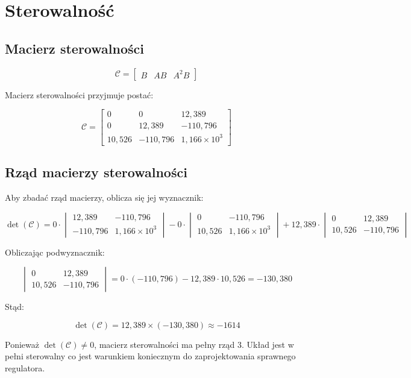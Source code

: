 \section{Sterowalność}

\subsection{Macierz sterowalności}

\begin{equation}
\mathcal{C} = \begin{bmatrix} B & AB & A^2 B \end{bmatrix}
\end{equation}

Macierz sterowalności przyjmuje postać:

\begin{equation}
\mathcal{C} = \begin{bmatrix} 0 & 0 & 12{,}389 \\ 0 & 12{,}389 & -110{,}796 \\ 10{,}526 & -110{,}796 & 1{,}166 \times 10^3 \end{bmatrix}
\end{equation}

\subsection{Rząd macierzy sterowalności}

Aby zbadać rząd macierzy, oblicza się jej wyznacznik:

\begin{equation}
\det(\mathcal{C}) = 0 \cdot \begin{vmatrix} 12{,}389 & -110{,}796 \\ -110{,}796 & 1{,}166 \times 10^3 \end{vmatrix} - 0 \cdot \begin{vmatrix} 0 & -110{,}796 \\ 10{,}526 & 1{,}166 \times 10^3 \end{vmatrix} + 12{,}389 \cdot \begin{vmatrix} 0 & 12{,}389 \\ 10{,}526 & -110{,}796 \end{vmatrix}
\end{equation}

Obliczając podwyznacznik:

\begin{equation}
\begin{vmatrix} 0 & 12{,}389 \\ 10{,}526 & -110{,}796 \end{vmatrix} = 0 \cdot (-110{,}796) - 12{,}389 \cdot 10{,}526 = -130{,}380
\end{equation}

Stąd:

\begin{equation}
\det(\mathcal{C}) = 12{,}389 \times (-130{,}380) \approx -1614
\end{equation}

Ponieważ $\det(\mathcal{C}) \neq 0$, macierz sterowalności ma pełny rząd 3. Układ jest w pełni sterowalny co jest warunkiem koniecznym do zaprojektowania sprawnego regulatora.
